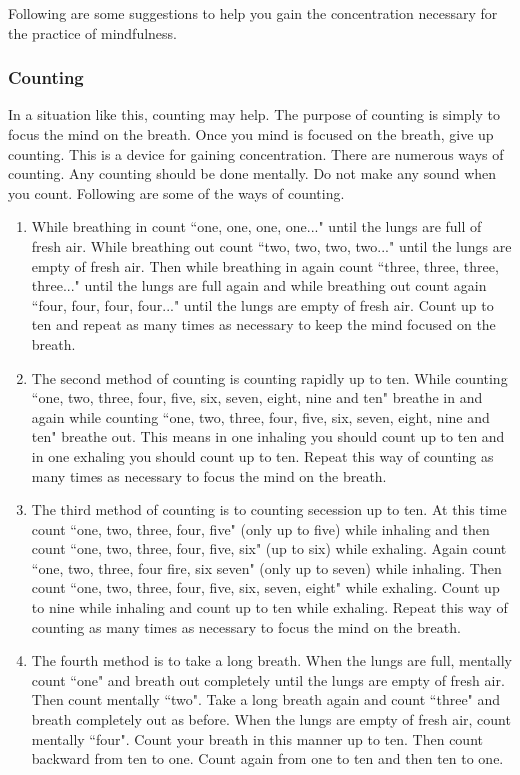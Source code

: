 Following are some suggestions to help you gain the concentration necessary for
the practice of mindfulness.
\subsubsection*{Counting}
In a situation like this, counting may help. The purpose of counting is simply to focus the mind on the breath. Once you mind is
focused on the breath, give up counting. This is a device for gaining concentration. There are numerous ways of counting. Any
counting should be done mentally. Do not make any sound when you count. Following are some of the ways of counting.

\begin{enumerate}
\item While breathing in count ``one, one, one, one..." until the lungs are full of
fresh air. While breathing out count ``two, two, two, two..." until the lungs are
empty of fresh air. Then while breathing in again count ``three, three, three,
three..." until the lungs are full again and while breathing out count again
``four, four, four, four..." until the lungs are empty of fresh air. Count up to
ten and repeat as many times as necessary to keep the mind focused on the
breath.

\item The second method of counting is counting rapidly up to ten. While counting
``one, two, three, four, five, six, seven, eight, nine and ten" breathe in and
again while counting ``one, two, three, four, five, six, seven, eight, nine and
ten" breathe out. This means in one inhaling you should count up to ten and in
one exhaling you should count up to ten. Repeat this way of counting as many
times as necessary to focus the mind on the breath.

\item The third method of counting is to counting secession up to ten. At this time
count ``one, two, three, four, five" (only up to five) while inhaling and then
count ``one, two, three, four, five, six" (up to six) while exhaling. Again count
``one, two, three, four fire, six seven" (only up to seven) while inhaling. Then
count ``one, two, three, four, five, six, seven, eight" while exhaling. Count up
to nine while inhaling and count up to ten while exhaling. Repeat this way of
counting as many times as necessary to focus the mind on the breath.

\item The fourth method is to take a long breath. When the lungs are full, mentally
count ``one" and breath out completely until the lungs are empty of fresh air.
Then count mentally ``two". Take a long breath again and count ``three" and breath
completely out as before. When the lungs are empty of fresh air, count mentally
``four". Count your breath in this manner up to ten. Then count backward from ten
to one. Count again from one to ten and then ten to one.


\end{enumerate}

